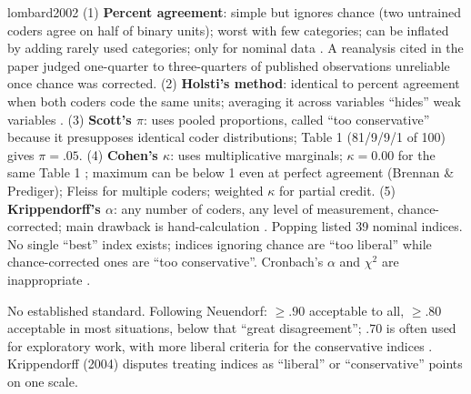\begin{papercard}{lombard2002}
 (1) \textbf{Percent agreement}: simple but ignores chance (two untrained coders agree on half of binary units); worst with few categories; can be inflated by adding rarely used categories; only for nominal data . A reanalysis cited in the paper judged one-quarter to three-quarters of published observations unreliable once chance was corrected. (2) \textbf{Holsti's method}: identical to percent agreement when both coders code the same units; averaging it across variables ``hides'' weak variables . (3) \textbf{Scott's $\pi$}: uses pooled proportions, called ``too conservative'' because it presupposes identical coder distributions; Table 1 (81/9/9/1 of 100) gives $\pi=.05$. (4) \textbf{Cohen's $\kappa$}: uses multiplicative marginals; $\kappa=0.00$ for the same Table 1 ; maximum can be below 1 even at perfect agreement (Brennan \& Prediger); Fleiss for multiple coders; weighted $\kappa$ for partial credit. (5) \textbf{Krippendorff's $\alpha$}: any number of coders, any level of measurement, chance-corrected; main drawback is hand-calculation . Popping listed 39 nominal indices. No single ``best'' index exists; indices ignoring chance are ``too liberal'' while chance-corrected ones are ``too conservative''. Cronbach's $\alpha$ and $\chi^2$ are inappropriate .

 No established standard. Following Neuendorf: $\ge.90$ acceptable to all, $\ge.80$ acceptable in most situations, below that ``great disagreement''; $.70$ is often used for exploratory work, with more liberal criteria for the conservative indices . Krippendorff (2004) disputes treating indices as ``liberal'' or ``conservative'' points on one scale.


\end{papercard}
